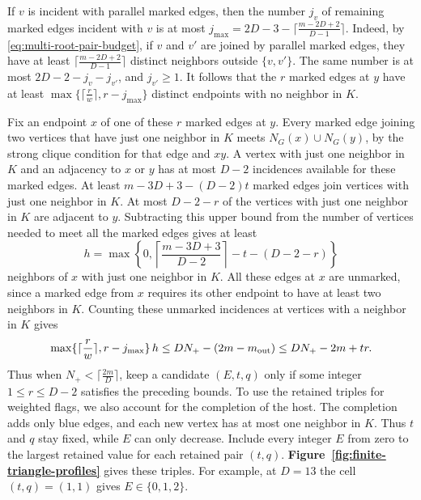 \documentclass[preprint,11pt,numbers]{elsarticle-arxiv}
\numberwithin{equation}{section}
\theoremstyle{definition}
\begin{document}
If $v$ is incident with parallel marked edges, then the number
$j_v$ of remaining marked edges incident with $v$ is at most
$j_{\max}=2D-3-\lceil\frac{m-2D+2}{D-1}\rceil$. Indeed, by
\eqref{eq:multi-root-pair-budget}, if $v$ and $v'$ are joined by
parallel marked edges, they have at least
$\lceil\frac{m-2D+2}{D-1}\rceil$ distinct neighbors outside $\{v,v'\}$.
The same number is at most
$2D-2-j_v-j_{v'}$, and $j_{v'}\ge1$. It follows that the $r$
marked edges at $y$ have at least
$\max\{\lceil\frac{r}{w}\rceil,r-j_{\max}\}$ distinct endpoints
with no neighbor in $K$.

Fix an endpoint $x$ of one of these $r$ marked edges at $y$.
Every marked edge joining two vertices that have just one neighbor
in $K$ meets $N_G(x)\cup N_G(y)$, by the strong clique condition
for that edge and $xy$. A vertex with just one neighbor in $K$
and an adjacency to $x$ or $y$ has at most $D-2$ incidences
available for these marked edges. At least $m-3D+3-(D-2)t$
marked edges join vertices with just one neighbor in $K$.
At most $D-2-r$ of the vertices with just one neighbor in $K$
are adjacent to $y$. Subtracting this upper bound from the
number of vertices needed to meet all the marked edges gives
at least
\[
 h=\max\left\{0,\left\lceil\frac{m-3D+3}{D-2}\right\rceil-t-(D-2-r)\right\}
\]
neighbors of $x$ with just one neighbor in $K$. All these
edges at $x$ are unmarked, since a marked edge from $x$ requires
its other endpoint to have at least two neighbors in $K$.
Counting these unmarked incidences at vertices with a neighbor
in $K$ gives
\[
 \max\{\lceil\frac{r}{w}\rceil,r-j_{\max}\}\,h
 \le DN_+-(2m-m_{\rm out})\le DN_+-2m+tr .
\]
Thus when $N_+<\lceil\frac{2m}{D}\rceil$, keep a candidate
$(E,t,q)$ only if some integer $1\leq r\leq D-2$ satisfies the
preceding bounds. To use the retained triples for weighted flags,
we also account for the completion of the host. The completion
adds only blue edges, and each new vertex has at most one
neighbor in $K$. Thus $t$ and $q$ stay fixed, while $E$ can
only decrease. Include every integer $E$ from zero to the largest
retained value for each retained pair $(t,q)$.
\textbf{Figure~\ref{fig:finite-triangle-profiles}} gives these triples.
For example,
at $D=13$ the cell $(t,q)=(1,1)$ gives $E\in\{0,1,2\}$.
\end{document}
